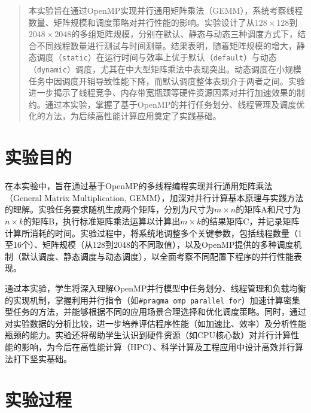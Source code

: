 \documentclass[a4paper, utf8]{ctexart}
\begin{document}
	\maketitle
	
	\renewcommand{\abstractname}{\large \textbf{摘要}}
	\begin{abstract}
		本实验旨在通过OpenMP实现并行通用矩阵乘法（GEMM），系统考察线程数量、矩阵规模和调度策略对并行性能的影响。实验设计了从$128\times128$到$2048\times2048$的多组矩阵规模，分别在默认、静态与动态三种调度方式下，结合不同线程数量进行测试与时间测量。结果表明，随着矩阵规模的增大，静态调度（\verb|static|）在运行时间与效率上优于默认（\verb|default|）与动态（\verb|dynamic|）调度，尤其在中大型矩阵乘法中表现突出。动态调度在小规模任务中因调度开销导致性能下降，而默认调度整体表现介于两者之间。实验进一步揭示了线程竞争、内存带宽瓶颈等硬件资源因素对并行加速效果的制约。通过本实验，掌握了基于OpenMP的并行任务划分、线程管理及调度优化的方法，为后续高性能计算应用奠定了实践基础。
		
	\end{abstract}
	
	\section{实验目的}
	
	在本实验中，旨在通过基于OpenMP的多线程编程实现并行通用矩阵乘法（General Matrix Multiplication, GEMM），加深对并行计算基本原理与实践方法的理解。实验任务要求随机生成两个矩阵，分别为尺寸为$m \times n$的矩阵A和尺寸为$n \times k$的矩阵B，执行标准矩阵乘法运算以计算出$m \times k$的结果矩阵C，并记录矩阵计算所消耗的时间。实验过程中，将系统地调整多个关键参数，包括线程数量（1至16个）、矩阵规模（从128到2048的不同取值），以及OpenMP提供的多种调度机制（默认调度、静态调度与动态调度），以全面考察不同配置下程序的并行性能表现。
	
	通过本实验，学生将深入理解OpenMP并行模型中任务划分、线程管理和负载均衡的实现机制，掌握利用并行指令（如\verb|#pragma omp parallel for|）加速计算密集型任务的方法，并能够根据不同的应用场景合理选择和优化调度策略。同时，通过对实验数据的分析比较，进一步培养评估程序性能（如加速比、效率）及分析性能瓶颈的能力。实验还将帮助学生认识到硬件资源（如CPU核心数）对并行计算性能的影响，为今后在高性能计算（HPC）、科学计算及工程应用中设计高效并行算法打下坚实基础。
	
	\section{实验过程}
	
\end{document}
